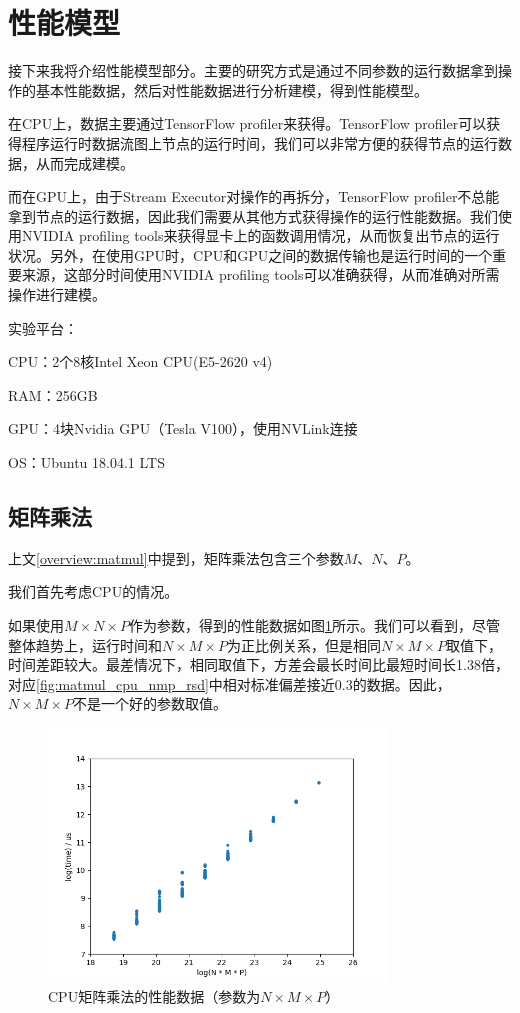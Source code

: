 \section{性能模型}
    接下来我将介绍性能模型部分。主要的研究方式是通过不同参数的运行数据拿到操作的基本性能数据，然后对性能数据进行分析建模，得到性能模型。
    
    在CPU上，数据主要通过TensorFlow profiler来获得。TensorFlow profiler可以获得程序运行时数据流图上节点的运行时间，我们可以非常方便的获得节点的运行数据，从而完成建模。
    
    而在GPU上，由于Stream Executor对操作的再拆分，TensorFlow profiler不总能拿到节点的运行数据，因此我们需要从其他方式获得操作的运行性能数据。我们使用NVIDIA profiling tools来获得显卡上的函数调用情况，从而恢复出节点的运行状况。另外，在使用GPU时，CPU和GPU之间的数据传输也是运行时间的一个重要来源，这部分时间使用NVIDIA profiling tools可以准确获得，从而准确对所需操作进行建模。
    
    实验平台：

        CPU：2个8核Intel Xeon CPU(E5-2620 v4)

        RAM：256GB

        GPU：4块Nvidia GPU（Tesla V100），使用NVLink连接
        
        OS：Ubuntu 18.04.1 LTS

\subsection{矩阵乘法}
    上文\ref{overview:matmul}中提到，矩阵乘法包含三个参数$ M $、$ N $、$ P $。
    
    我们首先考虑CPU的情况。
    
    如果使用$ M \times N \times P $作为参数，得到的性能数据如图\ref{fig:matmul_cpu_nmp}所示。我们可以看到，尽管整体趋势上，运行时间和$ N \times M \times P $为正比例关系，但是相同$ N \times M \times P $取值下，时间差距较大。最差情况下，相同取值下，方差会最长时间比最短时间长1.38倍，对应\ref{fig:matmul_cpu_nmp_rsd}中相对标准偏差接近0.3的数据。因此，$ N \times M \times P $不是一个好的参数取值。
    
    \begin{figure}[!htbp]
        \centering
        \includegraphics[width=0.8\textwidth]{figures/matmul_cpu_nmp.png}
        \caption{CPU矩阵乘法的性能数据（参数为$N \times M \times P $）}
        \label{fig:matmul_cpu_nmp}
    \end{figure}
    
